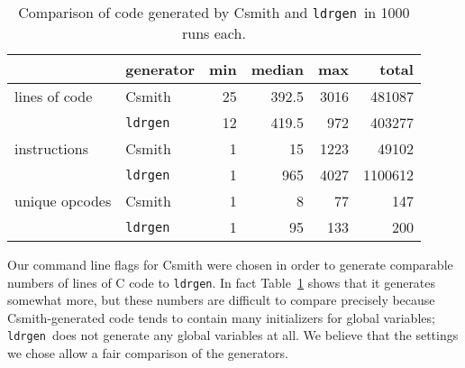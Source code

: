 \documentclass{llncs}
\newcommand\ldrgen{\texttt{ldrgen}}
\begin{document}
\begin{table}
\caption{Comparison of code generated by Csmith and \ldrgen\ in 1000 runs
each.}
\label{tab:results}

\centering
\begin{tabular}{l@{\ } | @{\ }l @{\quad} r @{\quad} r @{\quad} r @{\quad} r}

& generator & min & median & max & total \\
\hline
%
%
% 
% 
lines of code & Csmith
    & 25 & 392.5 & 3016 & 481087 \\
& \ldrgen
    & 12 & 419.5 &  972 & 403277
    \\[1ex]
instructions & Csmith
    & 1 &  15 & 1223 &   49102 \\
& \ldrgen
    & 1 & 965 & 4027 & 1100612
    \\[1ex]
unique opcodes & Csmith
    & 1 &  8 &  77 & 147 \\
& \ldrgen
    & 1 & 95 & 133 & 200
    \\
% 
% 
\end{tabular}
\end{table}

Our command line flags for Csmith were chosen in order to generate
comparable numbers of lines of C code to \ldrgen. In fact
Table~\ref{tab:results} shows that it generates somewhat more, but these
numbers are difficult to compare precisely because Csmith-generated code
tends to contain many initializers for global variables; \ldrgen\ does not
generate any global variables at all. We believe that the settings we chose
allow a fair comparison of the generators.
\end{document}
